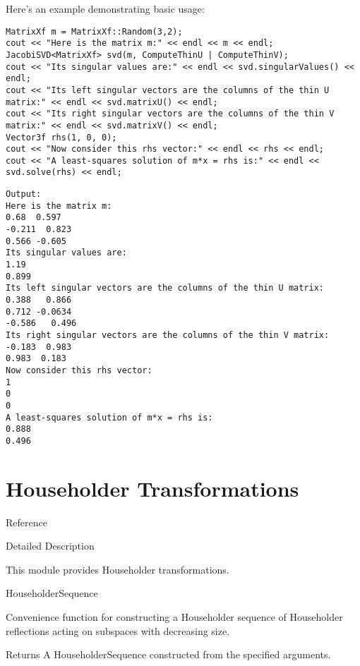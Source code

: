 Here's an example demonstrating basic usage: 

\begin{lstlisting}
MatrixXf m = MatrixXf::Random(3,2);
cout << "Here is the matrix m:" << endl << m << endl;
JacobiSVD<MatrixXf> svd(m, ComputeThinU | ComputeThinV);
cout << "Its singular values are:" << endl << svd.singularValues() << endl;
cout << "Its left singular vectors are the columns of the thin U matrix:" << endl << svd.matrixU() << endl;
cout << "Its right singular vectors are the columns of the thin V matrix:" << endl << svd.matrixV() << endl;
Vector3f rhs(1, 0, 0);
cout << "Now consider this rhs vector:" << endl << rhs << endl;
cout << "A least-squares solution of m*x = rhs is:" << endl << svd.solve(rhs) << endl;
\end{lstlisting}

\begin{verbatim}
Output:
Here is the matrix m:
0.68  0.597
-0.211  0.823
0.566 -0.605
Its singular values are:
1.19
0.899
Its left singular vectors are the columns of the thin U matrix:
0.388   0.866
0.712 -0.0634
-0.586   0.496
Its right singular vectors are the columns of the thin V matrix:
-0.183  0.983
0.983  0.183
Now consider this rhs vector:
1
0
0
A least-squares solution of m*x = rhs is:
0.888
0.496
\end{verbatim}




\newpage
\section{Householder Transformations}
\label{Householder Transformations}

Reference

Detailed Description

This module provides Householder transformations.


\vspace{0.3cm}  
HouseholderSequence

Convenience function for constructing a Householder sequence of Householder reflections acting on subspaces with decreasing size. 

Returns A HouseholderSequence constructed from the specified arguments. 


